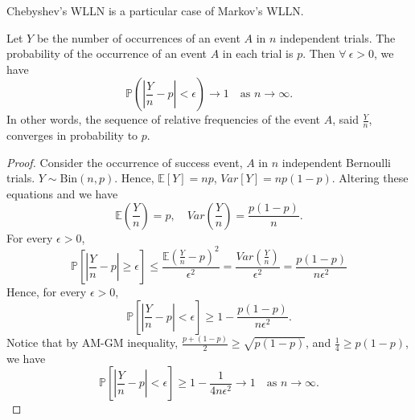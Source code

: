 \begin{remark}
    Chebyshev's WLLN is a particular case of Markov's WLLN.
\end{remark}

\begin{theorem}
    Let $Y$ be the number of occurrences of an event $A$ in $n$ independent
    trials. The probability of the occurrence of an event $A$ in each trial is $p$.
    Then $\forall \> \epsilon > 0$, we have
    \begin{equation}
        \mathbb{P} \left( \left| \frac{Y}{n} - p \right| < \epsilon \right) \to 1 \quad \text{as } n \to \infty.
    \end{equation}
    In other words, the sequence of relative frequencies of the event $A$, said $\frac{Y}{n}$,
    converges in probability to $p$.
\end{theorem}
\begin{proof}
    Consider the occurrence of success event, $A$ in $n$ independent
    Bernoulli trials. $Y \sim \text{Bin}(n, p)$.
    Hence, $\mathbb{E}[Y] = np$,
    $Var[Y] = np(1-p)$. Altering these equations and we have
    \[
        \mathbb{E} \left(\frac{Y}{n}\right) = p, \quad Var\left(\frac{Y}{n}\right) = \frac{p(1-p)}{n}.
    \]
    For every $\epsilon > 0$,
    \begin{equation}
        \mathbb{P} \left[ \left| \frac{Y}{n} - p \right| \geq \epsilon \right]
        \leq \frac{\mathbb{E}\left(\frac{Y}{n} - p\right)^2}{\epsilon^2}
        = \frac{Var\left(\frac{Y}{n}\right)}{\epsilon^2} = \frac{p(1-p)}{n\epsilon^2}
    \end{equation}
    Hence, for every $\epsilon > 0$,
    \[
        \mathbb{P} \left[ \left| \frac{Y}{n} - p \right| < \epsilon \right]
        \geq 1 - \frac{p(1-p)}{n\epsilon^2}.
    \]
    Notice that by AM-GM inequality, $\frac{p + (1-p)}{2} \geq \sqrt{p(1-p)}$,
    and $\frac{1}{4} \geq p(1-p)$, we have
    \[
        \mathbb{P} \left[ \left| \frac{Y}{n} - p \right| < \epsilon \right]
        \geq 1 - \frac{1}{4n\epsilon^2} \to 1 \quad \text{as } n \to \infty.
    \]
\end{proof}


